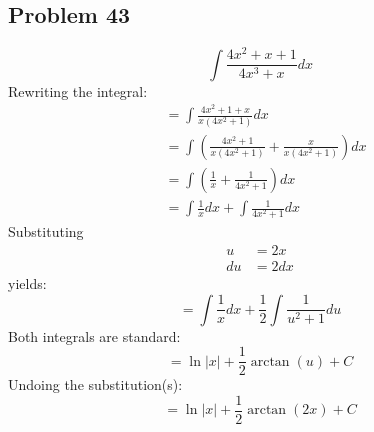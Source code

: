 \documentclass{article}
\begin{document}
\subsection*{Problem 43}
$$\int\frac{4x^2+x+1}{4x^3+x}dx$$
Rewriting the integral:
\begin{align*}
&=\int\frac{4x^2+1+x}{x(4x^2+1)}dx \\
&=\int\left(\frac{4x^2+1}{x(4x^2+1)}+\frac{x}{x(4x^2+1)}\right)dx \\
&=\int\left(\frac{1}{x}+\frac{1}{4x^2+1}\right)dx \\
&=\int\frac{1}{x}dx+\int\frac{1}{4x^2+1}dx
\end{align*}
Substituting
\begin{align*}
u&=2x \\
du&=2dx
\end{align*}
yields:
$$=\int\frac{1}{x}dx+\frac{1}{2}\int\frac{1}{u^2+1}du$$
Both integrals are standard:
$$=\ln|x|+\frac{1}{2}\arctan(u)+C$$
Undoing the substitution(s):
$$=\ln\left|x\right|+\frac{1}{2}\arctan(2x)+C$$
\end{document}
